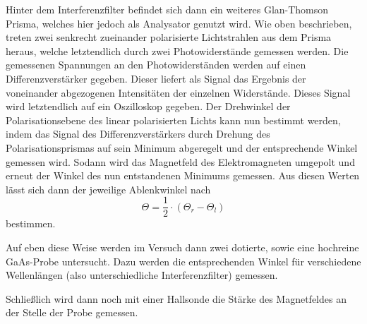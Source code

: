 Hinter dem Interferenzfilter befindet sich dann ein weiteres Glan-Thomson Prisma,
welches hier jedoch als Analysator genutzt wird. Wie oben beschrieben, treten zwei
senkrecht zueinander polarisierte Lichtstrahlen aus dem Prisma heraus, welche letztendlich
durch zwei Photowiderstände gemessen werden. Die gemessenen Spannungen an den Photowiderständen
werden auf einen Differenzverstärker gegeben. Dieser liefert als Signal das Ergebnis der voneinander
abgezogenen Intensitäten der einzelnen Widerstände. Dieses Signal wird letztendlich auf
ein Oszilloskop gegeben. Der Drehwinkel der Polarisationsebene des linear polarisierten Lichts
kann nun bestimmt werden, indem das Signal des Differenzverstärkers durch Drehung des
Polarisationsprismas auf sein Minimum abgeregelt und der entsprechende Winkel gemessen
wird. Sodann wird das Magnetfeld des Elektromagneten umgepolt und erneut der
Winkel des nun entstandenen Minimums gemessen. Aus diesen Werten lässt sich dann der
jeweilige Ablenkwinkel nach
\begin{equation}
  \Theta  = \frac{1}{2} \cdot (\Theta_r - \Theta_l)
\label{eqn:drehwinkel}
\end{equation}
bestimmen.

Auf eben diese Weise werden im Versuch dann zwei dotierte, sowie eine hochreine
GaAs-Probe untersucht. Dazu werden die entsprechenden Winkel für verschiedene
Wellenlängen (also unterschiedliche Interferenzfilter) gemessen.

Schließlich wird dann noch mit einer Hallsonde die Stärke des Magnetfeldes an der
Stelle der Probe gemessen.
